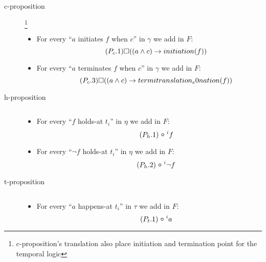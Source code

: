 \begin{description}
  \item[c-proposition]\footnote{c-proposition's translation also place initiation and termination point for the temporal logic}
  \begin{itemize}
    \item For every “$a$ initiates $f$ when $c$” in $\gamma$ we add in $F$:
    \begin{equation}\tag{$P_c.1$}
      \square((a\land c)\rightarrow initiation(f))
    \end{equation}
    \item For every “$a$ terminates $f$ when $c$” in $\gamma$ we add in $F$:
    \begin{equation}\tag{$P_c.3$}
      \square((a\land c)\rightarrow termitranslation_e0nation(f))
    \end{equation}
  \end{itemize}
  \item[h-proposition] $ $
  \begin{itemize}
    \item For every “$f$ holds-at $t_i$” in $\eta$ we add in $F$:
    \begin{equation}\tag{$P_h.1$}
      \next^{i}f
    \end{equation}
    \item For every “$\neg f$ holds-at $t_i$” in $\eta$ we add in $F$:
    \begin{equation}\tag{$P_h.2$}
      \next^{i} \neg f
    \end{equation}
  \end{itemize}
  \item[t-proposition] $ $
  \begin{itemize}
    \item For every “$a$ happens-at $t_i$” in $\tau$ we add in $F$:
    \begin{equation}\tag{$P_t.1$}
      \next^{i}a
    \end{equation}
  \end{itemize}
\end{description}

